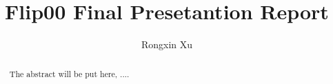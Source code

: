 \documentclass{amsart}
\begin{document}
%
%
\title[Xu's report]{Flip00 Final Presetantion Report}%

\author{Rongxin Xu}
\address[A.~1]{School of Business Administration,\\ 
Hunan University, Changsha 410012, China}%

%
%
\date{\gitAuthorDate}%

\begin{abstract}
The abstract will be put here, ....
\end{abstract}

\maketitle
\tableofcontents

\newpage



\newpage



\listoftodos
\end{document}
